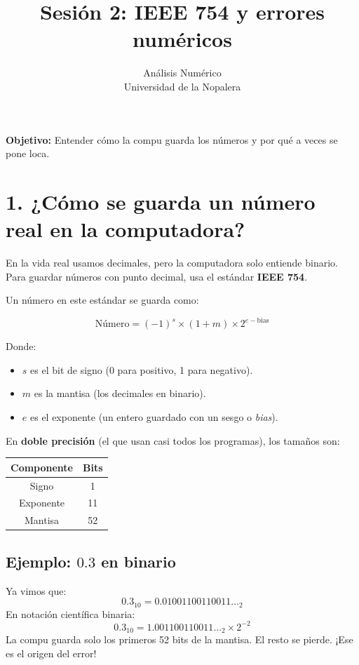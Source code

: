 \documentclass[12pt,letterpaper]{article}
\title{Sesión 2: IEEE 754 y errores numéricos}
\author{Análisis Numérico \\ \small{Universidad de la Nopalera}}
\date{}
\begin{document}
\maketitle

\begin{center}
\textbf{Objetivo:} Entender cómo la compu guarda los números y por qué a veces se pone loca.
\end{center}

\section*{1. ¿Cómo se guarda un número real en la computadora?}

En la vida real usamos decimales, pero la computadora solo entiende binario. Para guardar números con punto decimal, usa el estándar \textbf{IEEE 754}.

Un número en este estándar se guarda como:

\[
\text{Número} = (-1)^s \times (1 + m) \times 2^{e - \text{bias}}
\]

Donde:
\begin{itemize}
    \item $s$ es el bit de signo (0 para positivo, 1 para negativo).
    \item $m$ es la mantisa (los decimales en binario).
    \item $e$ es el exponente (un entero guardado con un sesgo o \textit{bias}).
\end{itemize}

En \textbf{doble precisión} (el que usan casi todos los programas), los tamaños son:

\begin{center}
\begin{tabular}{|c|c|}
\hline
\textbf{Componente} & \textbf{Bits} \\
\hline
Signo & 1 \\
Exponente & 11 \\
Mantisa & 52 \\
\hline
\end{tabular}
\end{center}

\subsection*{Ejemplo: $0.3$ en binario}
Ya vimos que:
\[
0.3_{10} = 0.01001100110011\ldots_2
\]
En notación científica binaria:
\[
0.3_{10} = 1.001100110011\ldots_2 \times 2^{-2}
\]
La compu guarda solo los primeros 52 bits de la mantisa. El resto se pierde. ¡Ese es el origen del error!
\end{document}
